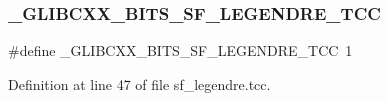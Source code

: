 \subsubsection{\texorpdfstring{\+\_\+\+G\+L\+I\+B\+C\+X\+X\+\_\+\+B\+I\+T\+S\+\_\+\+S\+F\+\_\+\+L\+E\+G\+E\+N\+D\+R\+E\+\_\+\+T\+CC}{\_GLIBCXX\_BITS\_SF\_LEGENDRE\_TCC}}
{\footnotesize\ttfamily \#define \+\_\+\+G\+L\+I\+B\+C\+X\+X\+\_\+\+B\+I\+T\+S\+\_\+\+S\+F\+\_\+\+L\+E\+G\+E\+N\+D\+R\+E\+\_\+\+T\+CC~1}



Definition at line 47 of file sf\+\_\+legendre.\+tcc.

